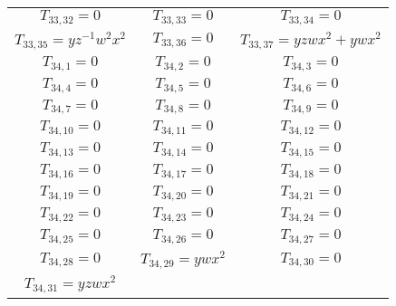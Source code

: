 \documentclass[12pt]{memoireuqam1.3}
\begin{document}
\begin{longtable}{|c|c|c|}
$T_{33,32}= 0$&

$T_{33,33}= 0$&

$T_{33,34}= 0$\\

$T_{33,35}= yz^{-1}w^2x^2$&

$T_{33,36}= 0$&

$T_{33,37}= yzwx^2+ywx^2$\\

$T_{34,1}= 0$&

$T_{34,2}= 0$&

$T_{34,3}= 0$\\

$T_{34,4}= 0$&

$T_{34,5}= 0$&

$T_{34,6}= 0$\\

$T_{34,7}= 0$&

$T_{34,8}= 0$&

$T_{34,9}= 0$\\

$T_{34,10}= 0$&

$T_{34,11}= 0$&

$T_{34,12}= 0$\\

$T_{34,13}= 0$&

$T_{34,14}= 0$&

$T_{34,15}= 0$\\

$T_{34,16}= 0$&

$T_{34,17}= 0$&

$T_{34,18}= 0$\\

$T_{34,19}= 0$&

$T_{34,20}= 0$&

$T_{34,21}= 0$\\

$T_{34,22}= 0$&

$T_{34,23}= 0$&

$T_{34,24}= 0$\\

$T_{34,25}= 0$&

$T_{34,26}= 0$&

$T_{34,27}= 0$\\

$T_{34,28}= 0$&

$T_{34,29}= ywx^2$&

$T_{34,30}= 0$\\

$T_{34,31}= yzwx^2$&


\end{longtable}
\end{document}
